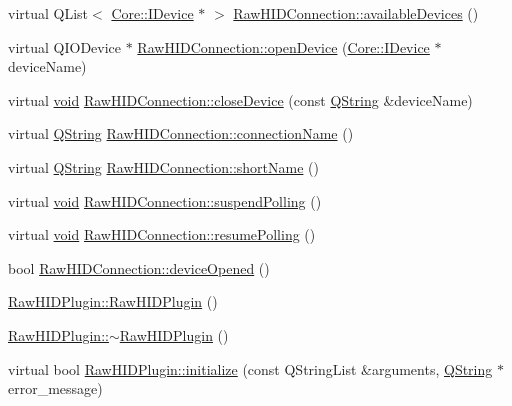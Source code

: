 \begin{DoxyCompactItemize}
\item 
virtual \-Q\-List$<$ \hyperlink{class_core_1_1_i_device}{\-Core\-::\-I\-Device} $\ast$ $>$ \hyperlink{group___raw_h_i_d_plugin_ga9a33750f32a6e48ba7463beaacf3696d}{\-Raw\-H\-I\-D\-Connection\-::available\-Devices} ()
\item 
virtual \-Q\-I\-O\-Device $\ast$ \hyperlink{group___raw_h_i_d_plugin_ga861af14dd75658d985780004160aefa2}{\-Raw\-H\-I\-D\-Connection\-::open\-Device} (\hyperlink{class_core_1_1_i_device}{\-Core\-::\-I\-Device} $\ast$device\-Name)
\item 
virtual \hyperlink{group___u_a_v_objects_plugin_ga444cf2ff3f0ecbe028adce838d373f5c}{void} \hyperlink{group___raw_h_i_d_plugin_ga80b9d6de6f0e054368bb3d920aa36de4}{\-Raw\-H\-I\-D\-Connection\-::close\-Device} (const \hyperlink{group___u_a_v_objects_plugin_gab9d252f49c333c94a72f97ce3105a32d}{\-Q\-String} \&device\-Name)
\item 
virtual \hyperlink{group___u_a_v_objects_plugin_gab9d252f49c333c94a72f97ce3105a32d}{\-Q\-String} \hyperlink{group___raw_h_i_d_plugin_ga753e060b5d2c26ebd344c084750bf715}{\-Raw\-H\-I\-D\-Connection\-::connection\-Name} ()
\item 
virtual \hyperlink{group___u_a_v_objects_plugin_gab9d252f49c333c94a72f97ce3105a32d}{\-Q\-String} \hyperlink{group___raw_h_i_d_plugin_gadf376fe560ac0b2e750fd4797139f602}{\-Raw\-H\-I\-D\-Connection\-::short\-Name} ()
\item 
virtual \hyperlink{group___u_a_v_objects_plugin_ga444cf2ff3f0ecbe028adce838d373f5c}{void} \hyperlink{group___raw_h_i_d_plugin_gac46703708a7e43cffa7712ebab818ba0}{\-Raw\-H\-I\-D\-Connection\-::suspend\-Polling} ()
\item 
virtual \hyperlink{group___u_a_v_objects_plugin_ga444cf2ff3f0ecbe028adce838d373f5c}{void} \hyperlink{group___raw_h_i_d_plugin_gabe7a095aa167ae8addf65d14e2dcc460}{\-Raw\-H\-I\-D\-Connection\-::resume\-Polling} ()
\item 
bool \hyperlink{group___raw_h_i_d_plugin_ga9bd370fd09da409d89f1dd7612d482cb}{\-Raw\-H\-I\-D\-Connection\-::device\-Opened} ()
\item 
\hyperlink{group___raw_h_i_d_plugin_gab33af7d70867d692cd24d8f740449278}{\-Raw\-H\-I\-D\-Plugin\-::\-Raw\-H\-I\-D\-Plugin} ()
\item 
\hyperlink{group___raw_h_i_d_plugin_ga0201928dc19d45a2e3771f6631af7fd5}{\-Raw\-H\-I\-D\-Plugin\-::$\sim$\-Raw\-H\-I\-D\-Plugin} ()
\item 
virtual bool \hyperlink{group___raw_h_i_d_plugin_ga52bbfe9d4f2cd93a959bdd723438e522}{\-Raw\-H\-I\-D\-Plugin\-::initialize} (const \-Q\-String\-List \&arguments, \hyperlink{group___u_a_v_objects_plugin_gab9d252f49c333c94a72f97ce3105a32d}{\-Q\-String} $\ast$error\-\_\-message)

\end{DoxyCompactItemize}
